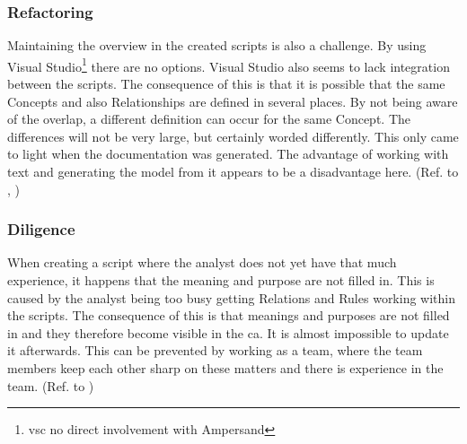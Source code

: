 \subsubsection{Refactoring}\label{subsub:1_refactoring}
Maintaining the overview in the created scripts is also a challenge.
By using Visual Studio\footnote{\acrlong{vsc} no direct involvement with Ampersand}  there are no  options.
Visual Studio also seems to lack integration between the scripts.
The consequence of this is that it is possible that the same Concepts and also Relationships are defined in several places.
By not being aware of the overlap, a different definition can occur for the same Concept.
The differences will not be very large, but certainly worded differently.
This only came to light when the documentation was generated.
The advantage of working with text and generating the model from it appears to be a disadvantage here.
(Ref. to , )

\subsubsection{Diligence}\label{subsub:1_diligence}
When creating a script where the analyst does not yet have that much experience, it happens that the meaning and purpose are not filled in.
This is caused by the analyst being too busy getting Relations and Rules working within the scripts.
The consequence of this is that meanings and purposes are not filled in and they therefore become visible in the \acrshort{ca}.
It is almost impossible to update it afterwards.
This can be prevented by working as a team, where the team members keep each other sharp on these matters and there is experience in the team.
(Ref. to )


\begin{comment}
@startuml
skinparam handwritten true
node "Generiek" {
  [Persoon]
  [Inschrijving]
  [etc]
}
node "Arts" {
  [Component Arts]
}
node "Tandarts" {
  [Component Tandarts]
}
node "etc" {
  [Component etc..]
}
[Persoon] --> [Component Arts]
[Inschrijving] --> [Component Arts]
[Persoon] --> [Component Tandarts]
[Inschrijving] --> [Component Tandarts]
[Persoon] --> [Component etc..]
[Inschrijving] --> [Component etc..]
@enduml
\end{comment}
